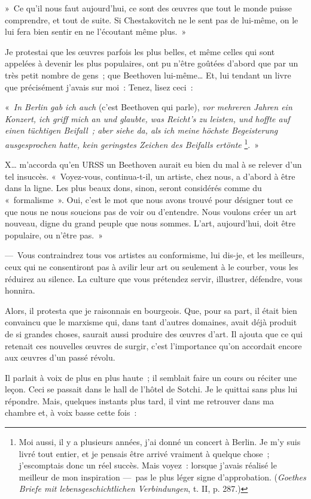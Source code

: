 \documentclass[french,twoside]{book} %
\begin{document}
» Ce qu’il nous faut aujourd’hui, ce sont des œuvres que tout le monde puisse comprendre, et tout de suite. Si Chestakovitch ne le sent pas de lui-même, on le lui fera bien sentir en ne l’écoutant même plus. »\par
Je protestai que les œuvres parfois les plus belles, et même celles qui sont appelées à devenir les plus populaires, ont pu n’être goûtées d’abord que par un très petit nombre de gens ; que Beethoven lui-même… Et, lui tendant un livre que précisément j’avais sur moi : Tenez, lisez ceci :\par
« \emph{In Berlin gab ich auch} (c’est Beethoven qui parle), \emph{vor mehreren Jahren ein Konzert, ich griff mich an und glaubte, was Reicht’s zu leisten, und hoffte auf einen tüchtigen Beifall ; aber siehe da, als ich meine höchste Begeisterung ausgesprochen hatte, kein geringstes Zeichen des Beifalls ertönte} \footnote{Moi aussi, il y a plusieurs années, j’ai donné un concert à Berlin. Je m’y suis livré tout entier, et je pensais être arrivé vraiment à quelque chose ; j’escomptais donc un réel succès. Mais voyez : lorsque j’avais réalisé le meilleur de mon inspiration — pas le plus léger signe d’approbation. (\emph{Goethes Briefe mit lebensgeschichtlichen Verbindungen}, t. II, p. 287.)}. »\par
X… m’accorda qu’en URSS un Beethoven aurait eu bien du mal à se relever d’un tel insuccès. « Voyez-vous, continua-t-il, un artiste, chez nous, a d’abord à être dans la ligne. Les plus beaux dons, sinon, seront considérés comme du « formalisme ». Oui, c’est le mot que nous avons trouvé pour désigner tout ce que nous ne nous soucions pas de voir ou d’entendre. Nous voulons créer un art nouveau, digne du grand peuple que nous sommes. L’art, aujourd’hui, doit être populaire, ou n’être pas. »\par
— Vous contraindrez tous vos artistes au conformisme, lui dis-je, et les meilleurs, ceux qui ne consentiront pas à avilir leur art ou seulement à le courber, vous les réduirez au silence. La culture que vous prétendez servir, illustrer, défendre, vous honnira.\par
Alors, il protesta que je raisonnais en bourgeois. Que, pour sa part, il était bien convaincu que le marxisme qui, dans tant d’autres domaines, avait déjà produit de si grandes choses, saurait aussi produire des œuvres d’art. Il ajouta que ce qui retenait ces nouvelles œuvres de surgir, c’est l’importance qu’on accordait encore aux œuvres d’un passé révolu.\par
Il parlait à voix de plus en plus haute ; il semblait faire un cours ou réciter une leçon. Ceci se passait dans le hall de l’hôtel de Sotchi. Je le quittai sans plus lui répondre. Mais, quelques instants plus tard, il vint me retrouver dans ma chambre et, à voix basse cette fois :\par
\end{document}
